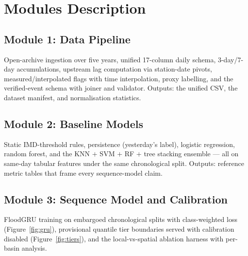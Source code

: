 \documentclass[a4paper,12pt]{report}
\begin{document}
\chapter{Modules Description}
\section{Module 1: Data Pipeline}
Open-archive ingestion over five years, unified 17-column daily schema, 3-day/7-day accumulations, upstream lag computation via station-date pivots, measured/interpolated flags with time interpolation, proxy labelling, and the verified-event schema with joiner and validator. Outputs: the unified CSV, the dataset manifest, and normalisation statistics.

\section{Module 2: Baseline Models}
Static IMD-threshold rules, persistence (yesterday's label), logistic regression, random forest, and the KNN $+$ SVM $+$ RF $+$ tree stacking ensemble --- all on same-day tabular features under the same chronological split. Outputs: reference metric tables that frame every sequence-model claim.

\section{Module 3: Sequence Model and Calibration}
FloodGRU training on embargoed chronological splits with class-weighted loss (Figure~\ref{fig:gru}), provisional quantile tier boundaries served with calibration disabled (Figure~\ref{fig:tiers}), and the local-vs-spatial ablation harness with per-basin analysis.
\end{document}
